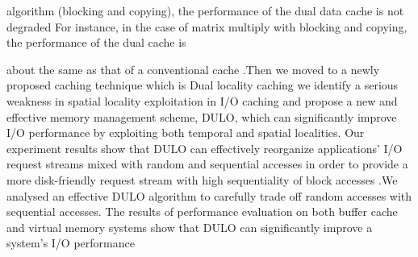 \documentclass[12pt]{article}
\begin{document}
algorithm (blocking and copying), the performance of the dual data cache is not degraded For instance, in the case of matrix multiply with blocking and copying, the performance of the dual cache is\par

\setlength{\parskip}{8.04pt}
about the same as that of a conventional cache .Then we moved to a newly proposed caching technique which is Dual locality caching we identify a serious weakness in spatial locality exploitation in I/O caching and propose a new and effective memory management scheme, DULO, which can significantly improve I/O performance by exploiting both temporal and spatial localities. Our experiment results show that DULO can effectively reorganize applications’ I/O request streams mixed with random and sequential accesses in order to provide a more disk-friendly request stream with high sequentiality of block accesses .We analysed an effective DULO algorithm to carefully trade off random accesses with sequential accesses. The results of performance evaluation on both buffer cache and virtual memory systems show that DULO can significantly improve a system’s I/O performance\par


\vspace{\baselineskip}

\printbibliography
\end{document}
